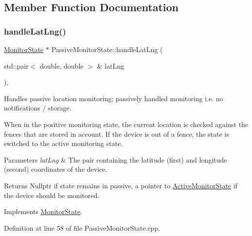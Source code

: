 \subsection{Member Function Documentation}
\mbox{\label{class_passive_monitor_state_a173a7c8a4d0b8ecea5928e0c90dec26b}} 
\subsubsection{\texorpdfstring{handle\+Lat\+Lng()}{handleLatLng()}}
{\footnotesize\ttfamily \hyperlink{class_monitor_state}{Monitor\+State} $\ast$ Passive\+Monitor\+State\+::handle\+Lat\+Lng (\begin{DoxyParamCaption}\item[{std\+::pair$<$ double, double $>$ \&}]{lat\+Lng }\end{DoxyParamCaption})\hspace{0.3cm}{\ttfamily [override]}, {\ttfamily [virtual]}}

Handles passive location monitoring; passively handled monitoring i.\+e. no notifications / storage.

When in the positive monitoring state, the current location is checked against the fences that are stored in account. If the device is out of a fence, the state is switched to the active monitoring state.


\begin{DoxyParams}{Parameters}
{\em lat\+Lng} & The pair containing the latitude (first) and longitude (second) coordinates of the device. \\
\hline
\end{DoxyParams}
\begin{DoxyReturn}{Returns}
Nullptr if state remains in passive, a pointer to \hyperlink{class_active_monitor_state}{Active\+Monitor\+State} if the device should be monitored. 
\end{DoxyReturn}


Implements \hyperlink{class_monitor_state_a8c8b871e3e8308e11f35905dd8741878}{Monitor\+State}.



Definition at line 58 of file Passive\+Monitor\+State.\+cpp.



